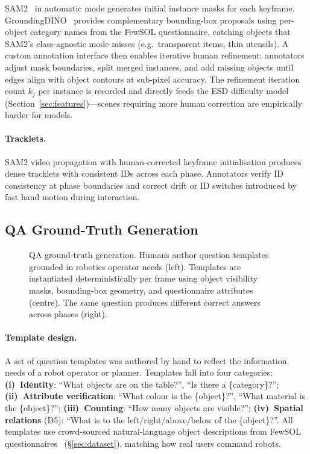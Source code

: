 SAM2~\citep{ravi2024sam2} in automatic mode generates initial instance masks for each keyframe.
GroundingDINO~\citep{liu2024groundingDINO} provides complementary bounding-box proposals using per-object category names from the FewSOL questionnaire, catching objects that SAM2's class-agnostic mode misses (e.g.\ transparent items, thin utensils).
A custom annotation interface then enables iterative human refinement: annotators adjust mask boundaries, split merged instances, and add missing objects until edges align with object contours at sub-pixel accuracy.
The refinement iteration count $k_j$ per instance is recorded and directly feeds the ESD difficulty model (Section~\ref{sec:features})---scenes requiring more human correction are empirically harder for models.

\paragraph{Tracklets.}
SAM2 video propagation with human-corrected keyframe initialisation produces dense tracklets with consistent IDs across each phase.
Annotators verify ID consistency at phase boundaries and correct drift or ID switches introduced by fast hand motion during interaction.

\subsection{QA Ground-Truth Generation}
\label{sec:appendix-qa}

\begin{figure}[h]
    \centering
    \caption{QA ground-truth generation. Humans author question templates grounded in robotics operator needs (left).
    Templates are instantiated deterministically per frame using object visibility masks, bounding-box geometry, and questionnaire attributes (centre).
    The same question produces different correct answers across phases (right).}
    \label{fig:qa-generation}
\end{figure}

\paragraph{Template design.}
A set of question templates was authored by hand to reflect the information needs of a robot operator or planner.
Templates fall into four categories:
\textbf{(i)~Identity}: ``What objects are on the table?'', ``Is there a \{category\}?'';
\textbf{(ii)~Attribute verification}: ``What colour is the \{object\}?'', ``What material is the \{object\}?'';
\textbf{(iii)~Counting}: ``How many objects are visible?'';
\textbf{(iv)~Spatial relations} (D5): ``What is to the left/right/above/below of the \{object\}?''.
All templates use crowd-sourced natural-language object descriptions from FewSOL questionnaires~\citep{padalunkal2023fewsol} (\S\ref{sec:dataset}), matching how real users command robots.

